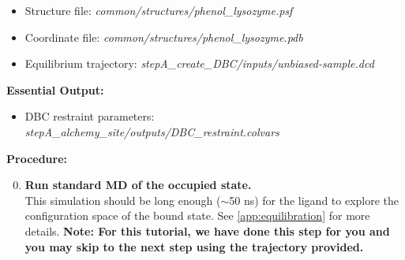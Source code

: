 \documentclass[9pt,tutorial]{Styling/livecoms}
\newcommand{\filepath}[1]{\textit{#1}}
\begin{document}
    \begin{itemize}
        \item Structure file: \filepath{common/structures/phenol\_lysozyme.psf} \item Coordinate file: \filepath{common/structures/phenol\_lysozyme.pdb}
        \item Equilibrium trajectory: \filepath{stepA\_create\_DBC/inputs/unbiased-sample.dcd}
    \end{itemize}
    \textbf{Essential Output:}
    \begin{itemize}
        \item DBC restraint parameters: \filepath{stepA\_alchemy\_site/outputs/DBC\_restraint.colvars}
    \end{itemize}
    \textbf{Procedure:}
    \begin{enumerate}
    \setcounter{enumi}{-1}
    \item \textbf{Run standard MD of the occupied state.}\label{step:unbiased}\\
    This simulation should be long enough ($\sim$50 ns) for the ligand to explore the configuration space of the bound state. See \ref{app:equilibration} for more details.
    \textbf{Note: For this tutorial, we have done this step for you and you may skip to the next step using the trajectory provided.}
    

\end{enumerate}
\end{document}
